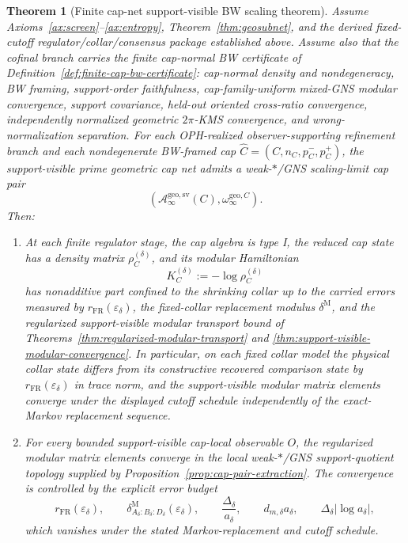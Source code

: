 \documentclass[11pt]{article}
\newtheorem{theorem}{Theorem}[section]
\begin{document}
\begin{theorem}[Finite cap-net support-visible BW scaling theorem]\label{thm:bw}
Assume Axioms~\ref{ax:screen}--\ref{ax:entropy}, Theorem~\ref{thm:geosubnet}, and the derived fixed-cutoff regulator/collar/consensus package established above. Assume also that the cofinal branch carries the finite cap-normal BW certificate of Definition~\ref{def:finite-cap-bw-certificate}: cap-normal density and nondegeneracy, BW framing, support-order faithfulness, cap-family-uniform mixed-GNS modular convergence, support covariance, held-out oriented cross-ratio convergence, independently normalized geometric \(2\pi\)-KMS convergence, and wrong-normalization separation. For each OPH-realized observer-supporting refinement branch and each nondegenerate BW-framed cap \(\widehat C=(C,n_C,p_C^-,p_C^+)\), the support-visible prime geometric cap net admits a weak-\(*\)/GNS scaling-limit cap pair
\[
(\mathcal A_\infty^{\mathrm{geo,sv}}(C),\omega_\infty^{\mathrm{geo},C}).
\]
Then:
\begin{enumerate}[label=\textup{(\roman*)},leftmargin=2em]
\item At each finite regulator stage, the cap algebra is type I, the reduced cap state has a density matrix \(\rho_C^{(\delta)}\), and its modular Hamiltonian
\[
K_C^{(\delta)}:=-\log \rho_C^{(\delta)}
\]
has nonadditive part confined to the shrinking collar up to the carried errors measured by \(r_{\mathrm{FR}}(\varepsilon_\delta)\), the fixed-collar replacement modulus \(\delta^{\mathrm M}\), and the regularized support-visible modular transport bound of Theorems~\ref{thm:regularized-modular-transport} and \ref{thm:support-visible-modular-convergence}. In particular, on each fixed collar model the physical collar state differs from its constructive recovered comparison state by \(r_{\mathrm{FR}}(\varepsilon_\delta)\) in trace norm, and the support-visible modular matrix elements converge under the displayed cutoff schedule independently of the exact-Markov replacement sequence.

\item For every bounded support-visible cap-local observable \(O\), the regularized modular
matrix elements converge in the local weak-\(*\)/GNS support-quotient topology supplied by
Proposition~\ref{prop:cap-pair-extraction}. The convergence is controlled by the explicit error
budget
\[
r_{\mathrm{FR}}(\varepsilon_\delta),\qquad
\delta^{\mathrm M}_{A_\delta:B_\delta:D_\delta}(\varepsilon_\delta),\qquad
\frac{\Delta_\delta}{a_\delta},\qquad
d_{m,\delta}a_\delta,\qquad
\Delta_\delta|\log a_\delta|,
\]
which vanishes under the stated Markov-replacement and cutoff schedule.


\end{enumerate}
\end{theorem}
\end{document}
